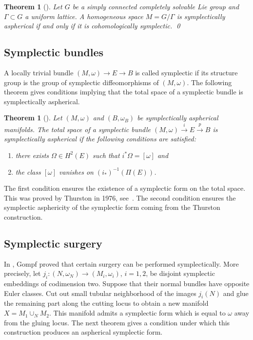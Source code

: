\documentclass[12pt]{amsart}
\newtheorem{theorem}[subsection]{Theorem}%
\numberwithin{equation}{section}
\theoremstyle{definition}
\theoremstyle{remark}
\numberwithin{figure}{section}
\numberwithin{table}{section}
\newcommand{\Om}{{\Omega}}
\newcommand{\om}{{\omega}}
\newcommand{\Mo}{(M,\omega )}
\begin{document}
\begin{theorem}[{\cite[Lemma 4.2]{IKRT}}] 
\label{T:homogeneous} 
Let $G$ be a simply connected completely solvable Lie group and 
$\Gamma \subset G$ a  uniform lattice. 
A homogeneous space $M=G/\Gamma$ is symplectically aspherical 
if and only if it is cohomologically symplectic. \qed 
\end{theorem} 
 
\subsection{Symplectic bundles}\label{SS:fibrations} 
 
A locally trivial bundle $\Mo \to E\to B$ is called 
symplectic if its structure group is the group of 
symplectic diffeomorphisms of $\Mo$. The following theorem 
gives conditions implying that the total space of a 
symplectic bundle is symplectically aspherical. 
 
\begin{theorem}[{\cite[Theorem 7.4]{IKRT}}] 
\label{T:fibrations} 
Let $\Mo$ and $(B,\omega_B)$ be symplectically 
aspherical manifolds. The total space of a symplectic 
bundle $\Mo\stackrel{i}\to E\stackrel{p}\to B$ is 
symplectically aspherical if the following conditions 
are satisfied: 
\begin{enumerate} 
\item 
there exists $\Om\in H^2(E)$ such that $i^*\Om=[\om]$ and 
\item 
the class $[\om]$ vanishes on $(i_*)^{-1}(\Pi(E))$. 
\end{enumerate} 
\end{theorem} 
 
The first condition ensures the existence of a symplectic 
form on the total space. This was proved by Thurston in 1976, see~\cite[Theorem 
6.3]{MS1}. 
 The second condition ensures the symplectic asphericity of the symplectic form  
 coming from the Thurston   
construction.  
 
\subsection{Symplectic surgery}\label{SS:surgery} 
 
In \cite{G1}, Gompf proved that certain surgery can 
be performed symplectically. More precisely, let 
$j_i:(N,\omega_N)\to (M_i,\omega_i)$, $i=1,2$, be disjoint symplectic 
embeddings of codimension two. Suppose that their normal bundles  
have opposite Euler classes. Cut out small tubular 
neighborhood of the images $j_i(N)$ and glue the  
remaining part along the cutting locus to obtain a new 
manifold $X=M_1\cup_N M_2$. This manifold admits a symplectic form 
which is equal to $\om$ away from the gluing locus. 
The next theorem gives a condition under which this 
construction produces an aspherical symplectic form. 
 
\end{document}
